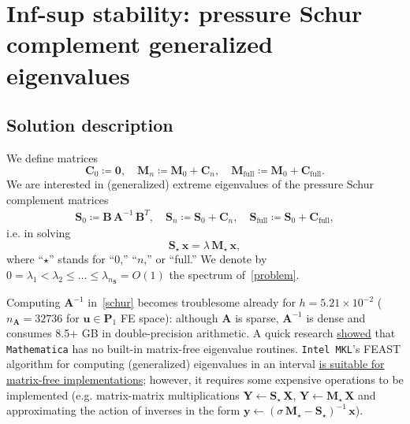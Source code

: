 \documentclass[12pt]{article}
\newcommand{\vect}[1]{\boldsymbol{\mathbf{#1}}}
\begin{document}
\section{Inf-sup stability: pressure Schur complement generalized eigenvalues}

\subsection{Solution description}

We define matrices 
\begin{equation}
	\vect C_0 \coloneqq \vect 0,\quad
	\vect M_n \coloneqq \vect M_0 + \vect C_n,\quad
	\vect M_{\text{full}} \coloneqq \vect M_0 + \vect C_{\text{full}}.
\end{equation}
We are interested in (generalized) extreme eigenvalues of the pressure Schur complement matrices
\begin{align}\label{schur}
	\vect S_0 \coloneqq \vect B\,\vect A^{-1}\,\vect B^{T},\quad
	\vect S_n \coloneqq \vect S_0 + \vect C_n,\quad
	\vect S_{\text{full}} \coloneqq \vect S_0 + \vect C_{\text{full}},
\end{align}
i.e. in solving
\begin{equation}\label{problem}
	\vect S_\star\,\vect x = \lambda\,\vect M_\star\,\vect x,
\end{equation}
where ``$\star$'' stands for ``$0$,'' ``$n$,'' or ``full.'' We denote by~$0 = \lambda_1 < \lambda_2 \le \dots \le \lambda_{n_{\vect S}} = O(1)$ the spectrum of~\eqref{problem}.

Computing $\vect A^{-1}$ in~\eqref{schur} becomes troublesome already for $h = 5.21\times10^{-2}$ ($n_{\vect A} = 32736$ for $\vect u \in \vect P_1$ FE space): although $\vect A$ is sparse, $\vect A^{-1}$ is dense and consumes 8.5+ GB in double-precision arithmetic. A quick research \href{https://mathematica.stackexchange.com/questions/189620/matrix-free-arnoldi-method-for-eigensystems}{showed} that \texttt{Mathematica} has no built-in matrix-free eigenvalue routines. \texttt{Intel MKL}'s FEAST algorithm for computing (generalized) eigenvalues in an interval \href{https://software.intel.com/sites/default/files/mkl-2019-developer-reference-c.pdf#_OPENTOPIC_TOC_PROCESSING_d62e853651}{is suitable for matrix-free implementations}; however, it requires some expensive operations to be implemented (e.g. matrix-matrix multiplications $\vect Y \leftarrow \vect S_\star\,\vect X$, $\vect Y \leftarrow \vect M_\star\,\vect X$ and approximating the action of inverses in the form $\vect y \leftarrow (\sigma\,\vect M_\star - \vect S_\star)^{-1}\,\vect x$).
\end{document}
